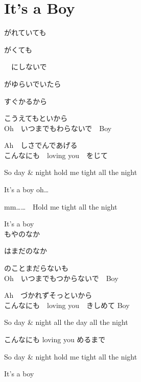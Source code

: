 \section{ It's a Boy}
\large{

がれていても

がくても

　にしないで

がゆらいでいたら

すぐかるから

こうえてもといから
\\

Oh　いつまでもわらないで　Boy

Ah　しさでんであげる　
\\

こんなにも　loving you　をじて

So day & night hold me tight all the night

It's a boy oh…

mm……　Hold me tight all the night

It's a boy
\\

もやのなか

はまだのなか

のことまだらないも
\\

Oh　いつまでもつからないで　Boy

Ah　づかれずそっといから
\\

こんなにも　loving you　きしめて Boy

So day & night all the day all the night

こんなにも loving you めるまで

So day & night hold me tight all the night

It's a boy

}
